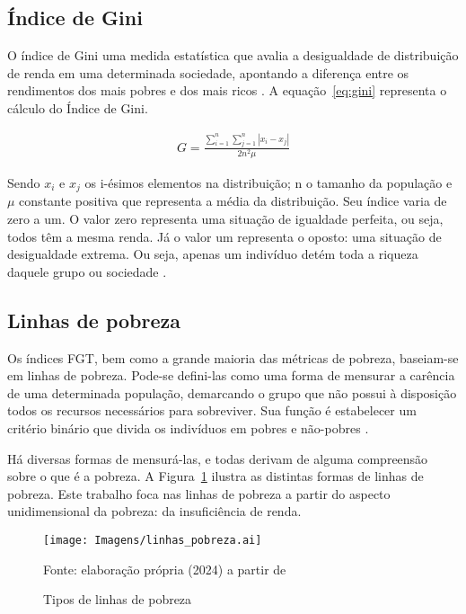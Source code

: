 \subsection{Índice de Gini}

O índice de Gini uma medida estatística que avalia a desigualdade de distribuição de renda em uma determinada sociedade, apontando a diferença entre os rendimentos dos mais pobres e dos mais ricos  \cite{hoffmann19}. A equação~\eqref{eq:gini} representa o cálculo do Índice de Gini.

\begin{align}
	G = \frac{\sum_{i=1}^{n}\sum_{j=1}^{n} | x_i - x_j |}{2n^{2}\mu} \label{eq:gini}
\end{align}

Sendo $x_i$ e $x_j$ os i-ésimos elementos na distribuição; n o tamanho da população e $\mu$ constante positiva que representa a média da distribuição. Seu índice varia de zero a um. O valor zero representa uma situação de igualdade perfeita, ou seja, todos têm a mesma renda. Já o valor um representa o oposto: uma situação de desigualdade extrema. Ou seja, apenas um indivíduo detém toda a riqueza daquele grupo ou sociedade \cite{hoffmann19}.


\subsection{Linhas de pobreza}

Os índices FGT, bem como a grande maioria das métricas de pobreza, baseiam-se em linhas de pobreza. Pode-se defini-las como uma forma de mensurar a carência de uma determinada população, demarcando o grupo que não possui à disposição todos os recursos necessários para sobreviver. Sua função é estabelecer um critério binário que divida os indivíduos em pobres e não-pobres \cite{soares09}.

Há diversas formas de mensurá-las, e todas derivam de alguma compreensão sobre o que é a pobreza. A Figura~\ref{fig:linhas_pobreza} ilustra as distintas formas de linhas de pobreza. Este trabalho foca nas linhas de pobreza a partir do aspecto unidimensional da pobreza: da insuficiência de renda.

\begin{figure}[h]
	\centering
	\texttt{[image: Imagens/linhas\_pobreza.ai]}
	\caption{Tipos de linhas de pobreza}
	\label{fig:linhas_pobreza}
	\footnotesize
	Fonte: elaboração própria (2024) a partir de \textcite{soares09}
\end{figure}

